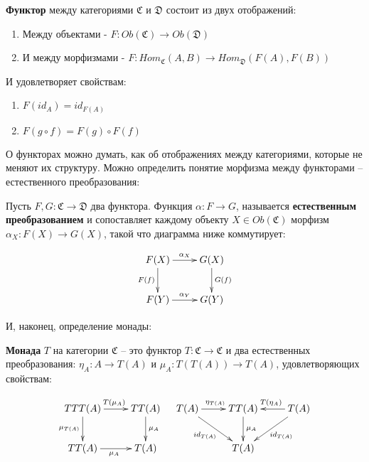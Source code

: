 \begin{definition}
  \textbf{Функтор} между категориями $\mathfrak{C}$ и $\mathfrak{D}$ состоит из двух отображений:
  \begin{enumerate}
    \item Между объектами - $F : Ob(\mathfrak{C}) \to Ob(\mathfrak{D})$
    \item И между морфизмами - $F : Hom_{\mathfrak{C}}(A, B) \to Hom_{\mathfrak{D}}(F(A), F(B))$
  \end{enumerate}

  И удовлетворяет свойствам:
  \begin{enumerate}
    \item $F(id_{A}) = id_{F(A)}$
    \item $F(g \circ f) = F(g) \circ F(f)$
  \end{enumerate}
\end{definition}

О функторах можно думать, как об отображениях между категориями, которые не меняют их структуру. Можно определить понятие морфизма между функторами -- естественного преобразования:

\begin{definition}
  Пусть $F, G : \mathfrak{C} \to \mathfrak{D}$ два функтора. Функция $\alpha : F \to G$, называется \textbf{естественным преобразованием} и сопоставляет каждому объекту $X \in Ob(\mathfrak{C})$ морфизм $\alpha_{X} : F(X) \to G(X)$, такой что диаграмма ниже коммутирует:

  \begin{displaymath}
    \xymatrix{
      F(X) \ar[r]^{\alpha_{X}} \ar[d]_{F(f)} & G(X) \ar[d]^{G(f)}\\
      F(Y) \ar[r]^{\alpha_{Y}} & G(Y)
    }
  \end{displaymath}
\end{definition}

И, наконец, определение монады:

\begin{definition}
  \textbf{Монада} $T$ на категории $\mathfrak{C}$ -- это функтор $T : \mathfrak{C} \to \mathfrak{C}$ и два естественных преобразования: $\eta_{A} : A \to T(A)$ и $\mu_{A} : T(T(A)) \to T(A)$, удовлетворяющих свойствам:

  \begin{displaymath}
    \xymatrix{ TTT(A) \ar[r]^{T(\mu_A)} \ar[d]_{\mu_{T(A)} } & TT(A) \ar[d]^{\mu_A} \\
                TT(A) \ar[r]_{\mu_A}                         & T(A)
              }
  \quad
     \xymatrix{ T(A) \ar[r]^{\eta_{T(A)}} \ar[rd]_{id_{T(A)}} & TT(A) \ar[d]^{\mu_A} & T(A) \ar[l]_{T(\eta_A)} \ar[dl]^{id_{T(A)}} \\
                                                              & T(A)
              }
  \end{displaymath}
\end{definition}

